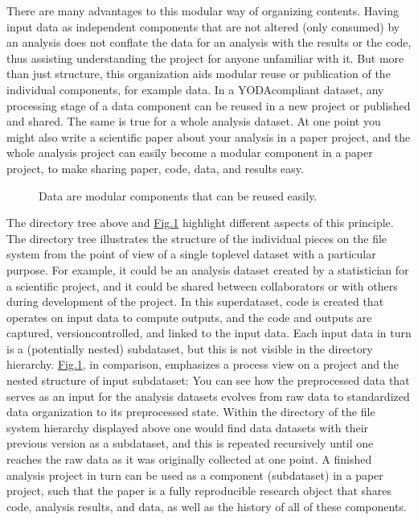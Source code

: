 \sphinxAtStartPar
There are many advantages to this modular way of organizing contents.
Having input data as independent components that are not altered (only
consumed) by an analysis does not conflate the data for
an analysis with the results or the code, thus assisting understanding
the project for anyone unfamiliar with it.
But more than just structure, this organization aids modular reuse or
publication of the individual components, for example data. In a
YODA\sphinxhyphen{}compliant dataset, any processing stage of a data component can
be reused in a new project or published and shared. The same is true
for a whole analysis dataset. At one point you might also write a
scientific paper about your analysis in a paper project, and the
whole analysis project can easily become a modular component in a paper
project, to make sharing paper, code, data, and results easy.

\begin{figure}[tbp]
\centering
\capstart

\noindent{}
\caption{Data are modular components that can be reused easily.}\label{\detokenize{basics/101-127-yoda:dataset-modules}}\end{figure}

\sphinxAtStartPar
The directory tree above and \hyperref[\detokenize{basics/101-127-yoda:dataset-modules}]{Fig.\@ \ref{\detokenize{basics/101-127-yoda:dataset-modules}}} highlight different aspects
of this principle. The directory tree illustrates the structure of
the individual pieces on the file system from the point of view of
a single top\sphinxhyphen{}level dataset with a particular purpose. For example, it
could be an analysis dataset created by a statistician for a scientific
project, and it could be shared between collaborators or
with others during development of the project. In this
superdataset, code is created that operates on input data to
compute outputs, and the code and outputs are captured,
version\sphinxhyphen{}controlled, and linked to the input data. Each input data in turn
is a (potentially nested) subdataset, but this is not visible
in the directory hierarchy.
\hyperref[\detokenize{basics/101-127-yoda:dataset-modules}]{Fig.\@ \ref{\detokenize{basics/101-127-yoda:dataset-modules}}}, in comparison, emphasizes a process view on a project and
the nested structure of input subdataset:
You can see how the preprocessed data that serves as an input for
the analysis datasets evolves from raw data to
standardized data organization to its preprocessed state. Within
the  directory of the file system hierarchy displayed
above one would find data datasets with their previous version as
a subdataset, and this is repeated recursively until one reaches
the raw data as it was originally collected at one point. A finished
analysis project in turn can be used as a component (subdataset) in
a paper project, such that the paper is a fully reproducible research
object that shares code, analysis results, and data, as well as the
history of all of these components.

